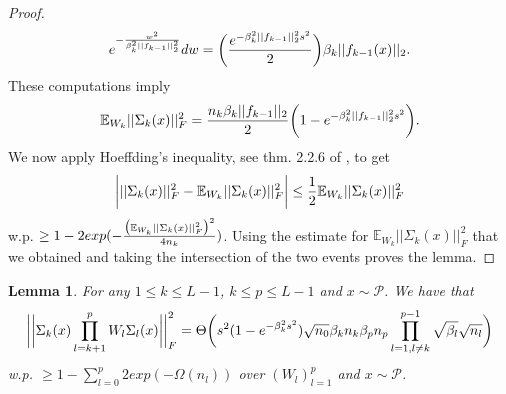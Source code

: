 \documentclass{article}
\theoremstyle{plain}
\newtheorem{lemma}[Theorem]{Lemma}
\theoremstyle{definition}
\theoremstyle{remark}
\begin{document}
\begin{proof}
\begin{equation*}
e^{-\frac{w^2}{\beta_k^2\vert\vert f_{k-1}\vert\vert_2^2}}dw = 
\bigg{(} 
\frac{e^{-\beta_k^2\vert\vert f_{k-1}\vert\vert^2_2s^2}}{2}
\bigg{)}\beta_k\vert\vert f_{k-1}(x)\vert\vert_2.
\end{equation*}
These computations imply
\begin{equation*}
\mathbb{E}_{W_k}\vert\vert\Sigma_k(x)\vert\vert_F^2 = 
\frac{n_k\beta_k\vert\vert f_{k-1}\vert\vert_2}{2}
\bigg{(} 
1- e^{-\beta_k^2\vert\vert f_{k-1}\vert\vert^2_2s^2}
\bigg{)}.
\end{equation*}
We now apply Hoeffding's inequality, see thm. 2.2.6 of \cite{vershynin2018high}, to get
\begin{equation*}
\bigg{\vert}
\vert\vert\Sigma_k(x)\vert\vert_F^2 - \mathbb{E}_{W_k}\vert\vert \Sigma_k(x)
\vert\vert_F^2
\bigg{\vert} \leq 
\frac{1}{2}\mathbb{E}_{W_k}\vert\vert\Sigma_k(x)\vert\vert_F^2
\end{equation*}
w.p. $\geq 1 - 2exp(-
\frac{\big{(}\mathbb{E}_{W_k}\vert\vert\Sigma_k(x)
\vert\vert_F^2\big{)}^2}{4n_k})$. Using the estimate for 
$\mathbb{E}_{W_k}\vert\vert\Sigma_k(x)\vert\vert_F^2$ that we obtained 
and taking the intersection of the two events
proves 
the lemma.
\end{proof}

\begin{lemma}\label{c6}
For any $1 \leq k \leq L-1$, $k \leq p \leq L-1$ and $x \sim \mathcal{P}$.
We have that
\begin{equation*}
\bigg{\vert}\bigg{\vert}
\Sigma_k(x)\prod_{l=k+1}^pW_l\Sigma_l(x)
\bigg{\vert}\bigg{\vert}^2_F = 
\Theta\bigg{(}
s^2(1 - e^{-\beta_k^2s^2})\sqrt{n_0}\beta_kn_k\beta_pn_p
\prod_{l=1, l\neq k}^{p-1}
\sqrt{\beta_l}\sqrt{n_l}
\bigg{)}
\end{equation*}
w.p. $\geq 1 - \sum_{l=0}^p2exp(-\Omega(n_l))$ over $(W_l)_{l=1}^p$ and 
$x \sim \mathcal{P}$.
\end{lemma}
\end{document}
